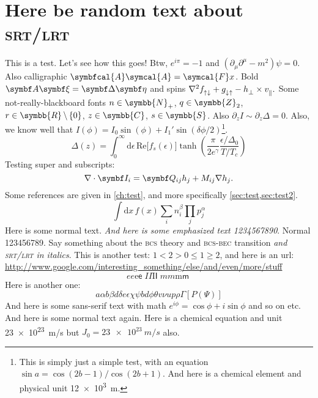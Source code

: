 \section{Here be random text about \textsc{srt/lrt}}\label{sec:test}
This is a test. Let's see how this goes! Btw, $e^{i\pi} = -1$ and $(\partial_\mu \partial^\mu - m^2) \psi = 0$.
Also calligraphic $\symbfcal{A}\symcal{A} = \symcal{F}x$.
Bold $\B{A}\B{\xi} = \B{\Delta}\B{\eta}$ and spins $\nabla^2 f_{\uparrow\downarrow}^{\vphantom{\dagger}}+g_{\downarrow\uparrow}^{\vphantom{\dagger}} - h_\perp^{\vphantom{*}} \times v_\parallel^{\vphantom{*}}.$
Some not-really-blackboard fonts $n \in \symbb{N}_+$, $q \in \symbb{Z}_2$, $r \in \symbb{R}\,\backslash\,\{0\}$, $z \in \symbb{C}$, $s \in \symbb{S}$. 
Also $\partial_z I \sim \partial_z \Delta = 0$.
Also, we know well that $I(\phi) = I_0 \sin(\phi) + I_1' \sin(\delta\phi/2)$\footnote{This is simply just a simple test, with an equation $\sin a = \cos(2b-1)/\cos(2b+1)$. And here is a chemical element  and physical unit \SI{12e3}{m}. }.
\begin{equation}
  \Delta(z) = \int_0^{\infty} \mathrm{d}\epsilon\,\mathrm{Re}\big[f_{\!s}(\epsilon)\big] \tanh\!\left(\frac{\pi}{2e^\gamma} \frac{\epsilon/\Delta_0}{T/T_c}\right)
\end{equation}
Testing super and subscripts:
\begin{equation}
  \nabla \cdot \B{I}_{i} = \B{Q}_{ij} h_j + M_{ij} \nabla h_j.
\end{equation}
Some references are given in \cref{ch:test}, and more specifically \cref{sec:test,sec:test2}.
\begin{equation}
  \int \mathrm{d}x\, f(x) \sum_i n_i^\beta \prod_j p_j^\alpha
\end{equation}
Here is some normal text. \textit{And here is some emphasized text 1234567890}. Normal 123456789. 
Say something about the \textsc{bcs} theory and \textsc{bcs-bec} transition \emph{and \textsc{srt/lrt} in italics}.
This is another test: $1 < 2 > 0 \leq 1 \geq 2$, and here is an url: \url{http://www.google.com/interesting_something/else/and/even/more/stuff}
\begin{equation}
  \textit{e}e\mathrm{e}\textsf{e}\;%
  \textit{I}I\mathrm{I}\textsf{I}\;%
  \textit{m}m\mathrm{m}\textsf{m}\;%
\end{equation}
Here is another one:
\begin{equation}
  a\alpha b\beta d\delta e\epsilon \chi\psi bd \phi\theta v\nu u p\rho \Gamma[P(\Psi)]
\end{equation}
\textsf{And here is some sans-serif text with math $e^{i\phi}=\cos\phi+i\sin\phi$ and so on etc.} And here is some normal text again.
Here is a chemical equation  and unit \SI{23e23}{m/s} but $J_0 = \SI{23e23}{m/s}$ also.

